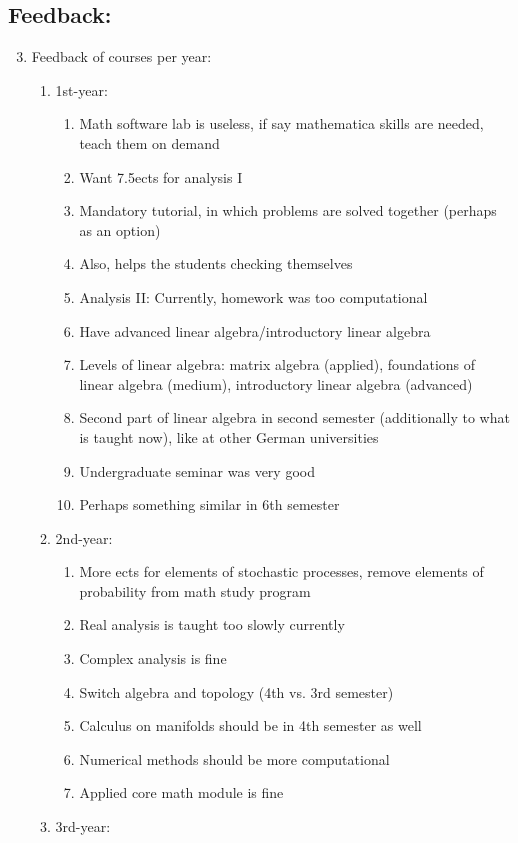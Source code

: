 \subsection{Feedback:}
\label{sec-1-2}
\begin{enumerate}
\setcounter{enumi}{2}
\item Feedback of courses per year:
\begin{enumerate}
\item 1st-year:
\begin{enumerate}
\item Math software lab is useless, if say mathematica skills are needed, teach them on demand
\item Want 7.5ects for analysis I
\item Mandatory tutorial, in which problems are solved together (perhaps as an option)
\item Also, helps the students checking themselves
\item Analysis II: Currently, homework was too computational
\item Have advanced linear algebra/introductory linear algebra
\item Levels of linear algebra: matrix algebra (applied), foundations of linear algebra (medium), introductory linear algebra (advanced)
\item Second part of linear algebra in second semester (additionally to what is taught now), like at other German universities
\item Undergraduate seminar was very good
\item Perhaps something similar in 6th semester
\end{enumerate}
\item 2nd-year:
\begin{enumerate}
\item More ects for elements of stochastic processes, remove elements of probability from math study program
\item Real analysis is taught too slowly currently
\item Complex analysis is fine
\item Switch algebra and topology (4th vs. 3rd semester)
\item Calculus on manifolds should be in 4th semester as well
\item Numerical methods should be more computational
\item Applied core math module is fine
\end{enumerate}
\item 3rd-year:

\end{enumerate}
\end{enumerate}
